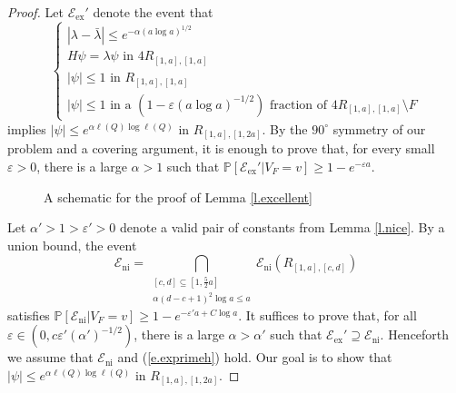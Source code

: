 \documentclass{amsart}
\newcommand{\eref}[1]{(\ref{e.#1})}
\newcommand{\lref}[1]{Lemma \ref{l.#1}}
\numberwithin{equation}{section}
\numberwithin{figure}{section}
\renewcommand{\P}{\mathbb{P}}
\newcommand{\ep}{\varepsilon}
\begin{document}
\begin{proof}
Let $\mathcal E_{\mathrm{ex}}'$ denote the event that
\begin{equation}
\label{e.exprimeh}
\begin{cases}
|\lambda - \bar \lambda| \leq e^{-\alpha (a \log a)^{1/2}} \\
H \psi = \lambda \psi \mbox{ in } 4 R_{[1,a],[1,a]} \\
|\psi| \leq 1 \mbox{ in } R_{[1,a],[1,a]} \\
|\psi| \leq 1 \mbox{ in a $(1-\ep (a \log a)^{-1/2})$ fraction of $4 R_{[1,a],[1,a]} \setminus F$}
\end{cases}
\end{equation}
implies $|\psi| \leq e^{\alpha \ell(Q) \log \ell(Q)}$ in $R_{[1,a],[1,2a]}$.  By the $90^\circ$ symmetry of our problem and a covering argument, it is enough to prove that, for every small $\ep > 0$, there is a large $\alpha > 1$ such that $\P[\mathcal E_{\mathrm{ex}}' | V_F = v] \geq 1 - e^{-\ep a}$.

\begin{figure}
\caption{A schematic for the proof of \lref{excellent}}
\label{f.excellent}
\end{figure}

Let $\alpha' > 1 > \ep' > 0$ denote a valid pair of constants from \lref{nice}.  By a union bound, the event\begin{equation*}
\mathcal E_{\mathrm{ni}} = \bigcap_{\substack{[c,d] \subseteq [1,\frac52 a] \\ \alpha (d - c + 1)^2 \log a \leq a}} \mathcal E_{\mathrm{ni}}(R_{[1,a],[c,d]})
\end{equation*}
satisfies $\P[\mathcal E_{\mathrm{ni}} | V_F = v] \geq 1 - e^{-\ep' a + C \log a}$.  It suffices to prove that, for all $\ep \in (0,c \ep' (\alpha')^{-1/2})$, there is a large $\alpha > \alpha'$ such that $\mathcal E_{\mathrm{ex}}' \supseteq \mathcal E_{\mathrm{ni}}$.  Henceforth we assume that $\mathcal E_{\mathrm{ni}}$ and \eref{exprimeh} hold.  Our goal is to show that $|\psi| \leq e^{\alpha \ell(Q) \log \ell(Q)}$ in $R_{[1,a],[1,2a]}$.


\end{proof}
\end{document}
